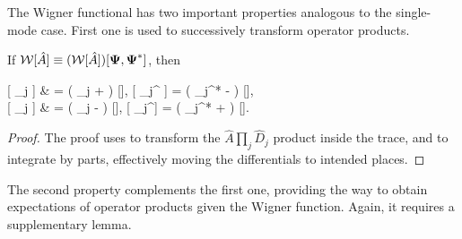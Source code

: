 The Wigner functional has two important properties analogous to the single-mode case.
First one is used to successively transform operator products.

\begin{theorem}
\label{thm:func-wigner:correspondences}
    If $\mathcal{W} [ \hat{A} ] \equiv (\mathcal{W} [ \hat{A} ]) [\boldsymbol{\Psi}, \boldsymbol{\Psi}^*]$, then
	\begin{eqn*}
		 [ \Psiop_j  ]
			& = \left( \Psi_j +   \right) ,
		\quad
		 [ \Psiop_j^\dagger {} ]
			= \left( \Psi_j^* -   \right) , \\
		 [  \Psiop_j ]
			& = \left( \Psi_j -   \right) ,
		\quad
		 [  \Psiop_j^\dagger ]
			= \left( \Psi_j^* +   \right) .
	\end{eqn*}
\end{theorem}
\begin{proof}
The proof uses  to transform the $ \prod_j \hat{D}_j$ product inside the trace, and  to integrate by parts, effectively moving the differentials to intended places.
\end{proof}

The second property complements the first one, providing the way to obtain expectations of operator products given the Wigner function.
Again, it requires a supplementary lemma.

